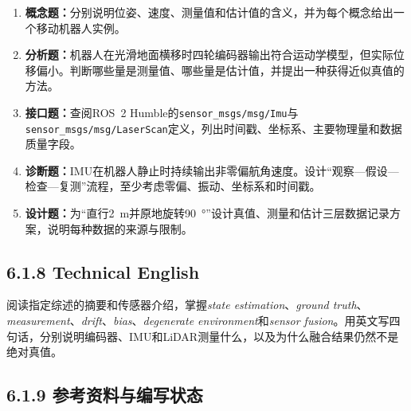 \documentclass[UTF8,zihao=-4]{ctexart}
\begin{document}
\begin{enumerate}
  \item \textbf{概念题：}分别说明位姿、速度、测量值和估计值的含义，并为每个概念给出一个移动机器人实例。
  \item \textbf{分析题：}机器人在光滑地面横移时四轮编码器输出符合运动学模型，但实际位移偏小。判断哪些量是测量值、哪些量是估计值，并提出一种获得近似真值的方法。
  \item \textbf{接口题：}查阅ROS~2 Humble的\texttt{sensor\_msgs/msg/Imu}与\texttt{sensor\_msgs/msg/LaserScan}定义，列出时间戳、坐标系、主要物理量和数据质量字段。
  \item \textbf{诊断题：}IMU在机器人静止时持续输出非零偏航角速度。设计“观察---假设---检查---复测”流程，至少考虑零偏、振动、坐标系和时间戳。
  \item \textbf{设计题：}为“直行\SI{2}{m}并原地旋转\SI{90}{\degree}”设计真值、测量和估计三层数据记录方案，说明每种数据的来源与限制。
\end{enumerate}

\subsection*{6.1.8 Technical English}

阅读指定综述的摘要和传感器介绍，掌握\emph{state estimation}、\emph{ground truth}、\emph{measurement}、\emph{drift}、\emph{bias}、\emph{degenerate environment}和\emph{sensor fusion}。用英文写四句话，分别说明编码器、IMU和LiDAR测量什么，以及为什么融合结果仍然不是绝对真值。

\subsection*{6.1.9 参考资料与编写状态}
\end{document}
